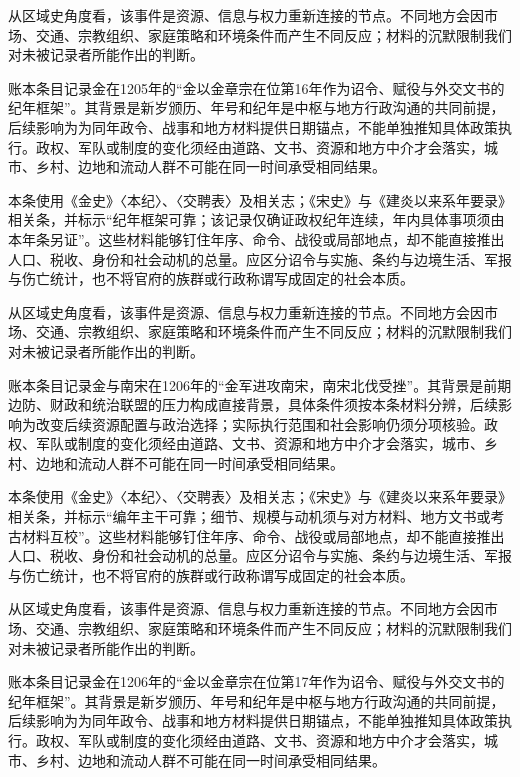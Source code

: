 从区域史角度看，该事件是资源、信息与权力重新连接的节点。不同地方会因市场、交通、宗教组织、家庭策略和环境条件而产生不同反应；材料的沉默限制我们对未被记录者所能作出的判断。

账本条目记录金在1205年的“金以金章宗在位第16年作为诏令、赋役与外交文书的纪年框架”。其背景是新岁颁历、年号和纪年是中枢与地方行政沟通的共同前提，后续影响为为同年政令、战事和地方材料提供日期锚点，不能单独推知具体政策执行。政权、军队或制度的变化须经由道路、文书、资源和地方中介才会落实，城市、乡村、边地和流动人群不可能在同一时间承受相同结果。

本条使用《金史》〈本纪〉、〈交聘表〉及相关志；《宋史》与《建炎以来系年要录》相关条，并标示“纪年框架可靠；该记录仅确证政权纪年连续，年内具体事项须由本年条另证”。这些材料能够钉住年序、命令、战役或局部地点，却不能直接推出人口、税收、身份和社会动机的总量。应区分诏令与实施、条约与边境生活、军报与伤亡统计，也不将官府的族群或行政称谓写成固定的社会本质。

从区域史角度看，该事件是资源、信息与权力重新连接的节点。不同地方会因市场、交通、宗教组织、家庭策略和环境条件而产生不同反应；材料的沉默限制我们对未被记录者所能作出的判断。

账本条目记录金与南宋在1206年的“金军进攻南宋，南宋北伐受挫”。其背景是前期边防、财政和统治联盟的压力构成直接背景，具体条件须按本条材料分辨，后续影响为改变后续资源配置与政治选择；实际执行范围和社会影响仍须分项核验。政权、军队或制度的变化须经由道路、文书、资源和地方中介才会落实，城市、乡村、边地和流动人群不可能在同一时间承受相同结果。

本条使用《金史》〈本纪〉、〈交聘表〉及相关志；《宋史》与《建炎以来系年要录》相关条，并标示“编年主干可靠；细节、规模与动机须与对方材料、地方文书或考古材料互校”。这些材料能够钉住年序、命令、战役或局部地点，却不能直接推出人口、税收、身份和社会动机的总量。应区分诏令与实施、条约与边境生活、军报与伤亡统计，也不将官府的族群或行政称谓写成固定的社会本质。

从区域史角度看，该事件是资源、信息与权力重新连接的节点。不同地方会因市场、交通、宗教组织、家庭策略和环境条件而产生不同反应；材料的沉默限制我们对未被记录者所能作出的判断。

账本条目记录金在1206年的“金以金章宗在位第17年作为诏令、赋役与外交文书的纪年框架”。其背景是新岁颁历、年号和纪年是中枢与地方行政沟通的共同前提，后续影响为为同年政令、战事和地方材料提供日期锚点，不能单独推知具体政策执行。政权、军队或制度的变化须经由道路、文书、资源和地方中介才会落实，城市、乡村、边地和流动人群不可能在同一时间承受相同结果。


